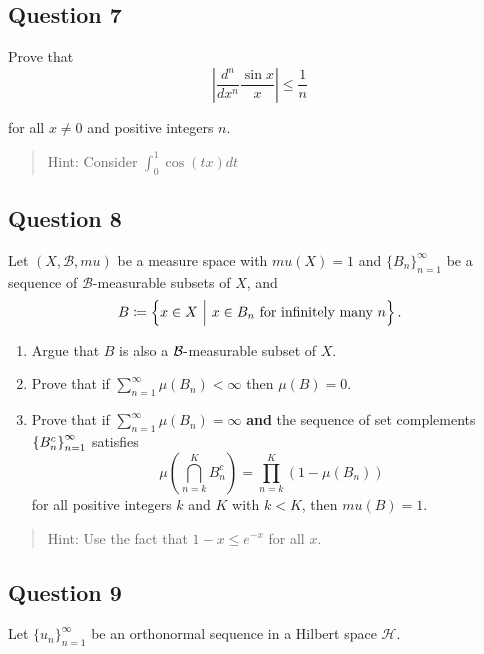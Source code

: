 \documentclass[12pt]{article}
\begin{document}
\hypertarget{question-7-1}{%
\subsection{Question 7}\label{question-7-1}}

Prove that \[
\left|\frac{d^{n}}{d x^{n}} \frac{\sin x}{x}\right| \leq \frac{1}{n}
\]

for all \(x \neq 0\) and positive integers \(n\).

\begin{quote}
Hint: Consider \(\displaystyle\int_0^1 \cos(tx) dt\)
\end{quote}

\hypertarget{question-8-1}{%
\subsection{Question 8}\label{question-8-1}}

Let \((X, \mathcal B, mu)\) be a measure space with \(mu(X) = 1\) and
\(\{B_n\}_{n=1}^\infty\) be a sequence of \(\mathcal B\)-measurable
subsets of \(X\), and \[
B \coloneqq \left\{{x\in X {~\mathrel{\Big|}~} x\in B_n \text{ for infinitely many } n}\right\}.
\]

\begin{enumerate}
\def\labelenumi{\alph{enumi}.}
\item
  Argue that \(B\) is also a \(\mathcal{B} {\hbox{-}}\)measurable subset of
  \(X\).
\item
  Prove that if \(\sum_{n=1}^\infty \mu(B_n) < \infty\) then
  \(\mu(B)= 0\).
\item
  Prove that if \(\sum_{n=1}^\infty \mu(B_n) = \infty\) \textbf{and} the
  sequence of set complements \(\left\{{B_n^c}\right\}_{n=1}^\infty\) satisfies
  \[
  \mu\left(\bigcap_{n=k}^{K} B_{n}^{c}\right)=\prod_{n=k}^{K}\left(1-\mu\left(B_{n}\right)\right)
  \] for all positive integers \(k\) and \(K\) with \(k < K\), then
  \(mu(B) = 1\).
\end{enumerate}

\begin{quote}
Hint: Use the fact that \(1 - x \leq e^{-x}\) for all \(x\).
\end{quote}

\hypertarget{question-9-1}{%
\subsection{Question 9}\label{question-9-1}}

Let \(\{u_n\}_{n=1}^\infty\) be an orthonormal sequence in a Hilbert
space \(\mathcal{H}\).
\end{document}
